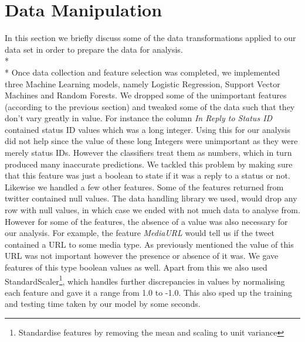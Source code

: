 \section{Data Manipulation}
In this section we briefly discuss some of the data transformations applied to our data set in order to prepare the data for analysis.\\*\\*
Once data collection and feature selection was completed, we implemented three Machine Learning models, namely Logistic Regression, Support Vector Machines and Random Forests. We dropped some of the unimportant features (according to the previous section) and tweaked some of the data such that they don't vary greatly in value. For instance the column \textit{In Reply to Status ID} contained status ID values which was a long integer. Using this for our analysis did not help since the value of these long Integers were unimportant as they were merely status IDs. However the classifiers treat them as numbers, which in turn produced many inaccurate predictions. We tackled this problem by making sure that this feature was just a boolean to state if it was a reply to a status or not. Likewise we handled a few other features. Some of the features returned from twitter contained null values. The data handling library we used, would drop any row with null values, in which case we ended with not much data to analyse from. However for some of the features, the absence of a value was also necessary for our analysis. For example, the feature \textit{MediaURL} would tell us if the tweet contained a URL to some media type. As previously mentioned the value of this URL was not important however the presence or absence of it was. We gave features of this type boolean values as well. Apart from this we also used StandardScaler\footnote{Standardise features by removing the mean and scaling to unit variance\cite{38}}, which handles further discrepancies in values by normalising each feature and gave it a range from 1.0 to -1.0. This also sped up the training and testing time taken by our model by some seconds.  
